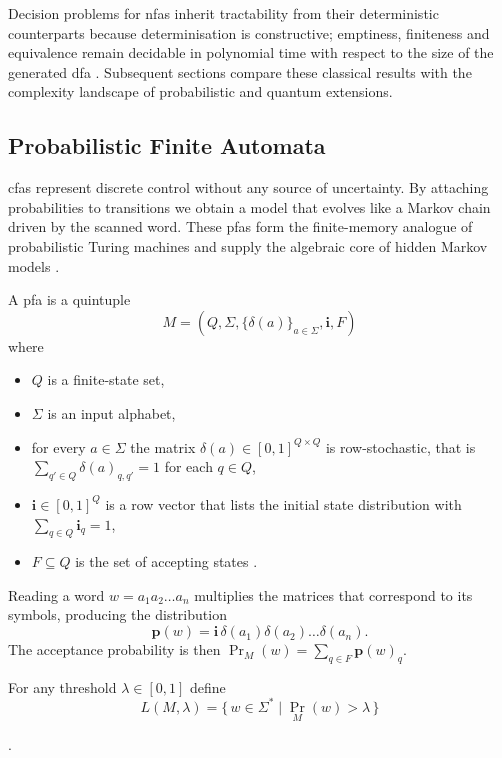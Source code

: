 Decision problems for \glspl{nfa} inherit tractability from their
deterministic counterparts because determinisation is constructive;
emptiness, finiteness and equivalence remain decidable in polynomial
time with respect to the size of the generated \gls{dfa}
\cite{hopcroft2001introduction}.  Subsequent sections compare these classical
results with the complexity landscape of probabilistic and quantum
extensions.

\subsection{Probabilistic Finite Automata}\label{subsec:pfa}

\glspl{cfa} represent discrete control without any source
of uncertainty.  By attaching probabilities to transitions we obtain a
model that evolves like a Markov chain driven by the scanned word.
These \glspl{pfa} form the finite-memory analogue of probabilistic
Turing machines and supply the algebraic core of hidden Markov models
\cite{rabin1963probabilistic}.

\begin{definition}\label{def:pfa}
  A \gls{pfa} is a quintuple
  \[
    M=(Q,\Sigma,\{\delta(a)\}_{a\in\Sigma},\mathbf{i},F)
  \]
  where
  \begin{itemize}
    \item $Q$ is a finite-state set,
    \item $\Sigma$ is an input alphabet,
    \item for every $a\in\Sigma$ the matrix
          $\delta(a)\in[0,1]^{Q\times Q}$ is
          row-stochastic, that is
          $\sum_{q'\in Q}\delta(a)_{q,q'}=1$ for each $q\in Q$,
    \item $\mathbf{i}\in[0,1]^{Q}$ is a row vector that lists the initial
          state distribution with $\sum_{q\in Q}\mathbf{i}_{q}=1$,
    \item $F\subseteq Q$ is the set of accepting states
          \cite{rabin1963probabilistic}.
  \end{itemize}
\end{definition}
  

Reading a word $w=a_{1}a_{2}\dots a_{n}$ multiplies the matrices that
correspond to its symbols, producing the distribution
\[
  \mathbf{p}(w)=
  \mathbf{i}\,\delta(a_{1})\delta(a_{2})\dots\delta(a_{n}).
\]
The acceptance probability is then
$\Pr_{M}(w)=\sum_{q\in F}\mathbf{p}(w)_{q}$.

\begin{concept}\label{concept:cutpoint}
For any threshold $\lambda\in[0,1]$ define
\[
  L(M,\lambda)=
  \{\,w\in\Sigma^{\ast}\mid\Pr_{M}(w)>\lambda\,\}
\]
\end{concept}\cite{rabin1963probabilistic}.

